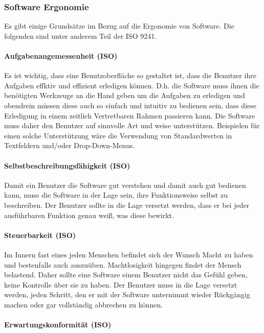 \subsubsection{Software Ergonomie}

Es gibt einige Grundsätze im Bezug auf die Ergonomie von Software. Die folgenden
sind unter anderem Teil der ISO 9241. 

\paragraph{Aufgabenangemessenheit (ISO)}

Es ist wichtig, dass eine Benutzoberfläche so gestaltet ist, dass die Benutzer
ihre Aufgaben effktiv und effizient erledigen können. D.h. die Software muss
ihnen die benötigten Werkzeuge an die Hand geben um die Aufgaben zu erledigen 
und obendrein müssen diese auch so einfach und intuitiv zu bedienen sein, dass
diese Erledigung in einem zeitlich Vertretbaren Rahmen passieren kann. Die
Software muss daher den Benutzer auf sinnvolle Art und weise unterstützen.
Beispielen für einen solche Unterstützung wäre die Verwendung von Standardwerten
in Textfeldern und/oder Drop-Down-Menus. 

\paragraph{Selbstbeschreibungsfähigkeit (ISO)}

Damit ein Benutzer die Software gut verstehen und damit auch gut bedienen kann,
muss die Software in der Lage sein, ihre Funktionsweise selbst zu beschreiben.
Der Benutzer sollte in die Lage versetzt werden, dass er bei jeder ausführbaren
Funktion genau weiß, was diese bewirkt.

\paragraph{Steuerbarkeit (ISO)}

Im Innern fast eines jeden Menschen befindet sich der Wunsch Macht zu haben und
bestenfalls auch auszuüben. Machtlosigkeit hingegen findet der Mensch belastend. 
Daher sollte eine Software einem Benutzer nicht das Gefühl geben, keine
Kontrolle über sie zu haben. Der Benutzer muss in die Lage versetzt werden,
jeden Schritt, den er mit der Software unternimmt wieder Rückgängig machen oder
gar vollständig abbrechen zu können. 

\paragraph{Erwartungskonformität (ISO)}


